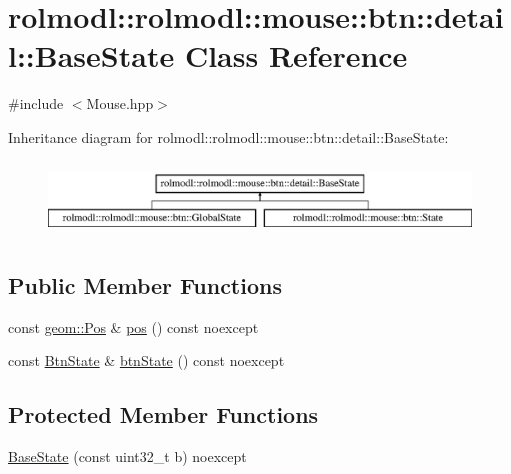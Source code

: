 \hypertarget{classrolmodl_1_1rolmodl_1_1mouse_1_1btn_1_1detail_1_1_base_state}{}\section{rolmodl\+::rolmodl\+::mouse\+::btn\+::detail\+::Base\+State Class Reference}
\label{classrolmodl_1_1rolmodl_1_1mouse_1_1btn_1_1detail_1_1_base_state}


{\ttfamily \#include $<$Mouse.\+hpp$>$}

Inheritance diagram for rolmodl\+::rolmodl\+::mouse\+::btn\+::detail\+::Base\+State\+:\begin{figure}[H]
\begin{center}
\leavevmode
\includegraphics[height=2.000000cm]{classrolmodl_1_1rolmodl_1_1mouse_1_1btn_1_1detail_1_1_base_state}
\end{center}
\end{figure}
\subsection*{Public Member Functions}
\begin{DoxyCompactItemize}
\item 
const \mbox{\hyperlink{structrolmodl_1_1geom_1_1_pos}{geom\+::\+Pos}} \& \mbox{\hyperlink{classrolmodl_1_1rolmodl_1_1mouse_1_1btn_1_1detail_1_1_base_state_a4ef40c6dc166e44b8b62067a1f5b821e}{pos}} () const noexcept
\item 
const \mbox{\hyperlink{structrolmodl_1_1rolmodl_1_1mouse_1_1btn_1_1_btn_state}{Btn\+State}} \& \mbox{\hyperlink{classrolmodl_1_1rolmodl_1_1mouse_1_1btn_1_1detail_1_1_base_state_a412f4ce55cb701be0cea39f592bf9796}{btn\+State}} () const noexcept
\end{DoxyCompactItemize}
\subsection*{Protected Member Functions}
\begin{DoxyCompactItemize}
\item 
\mbox{\hyperlink{classrolmodl_1_1rolmodl_1_1mouse_1_1btn_1_1detail_1_1_base_state_a36e882c50f0e17ea1472f06776f963b1}{Base\+State}} (const uint32\+\_\+t b) noexcept
\end{DoxyCompactItemize}
